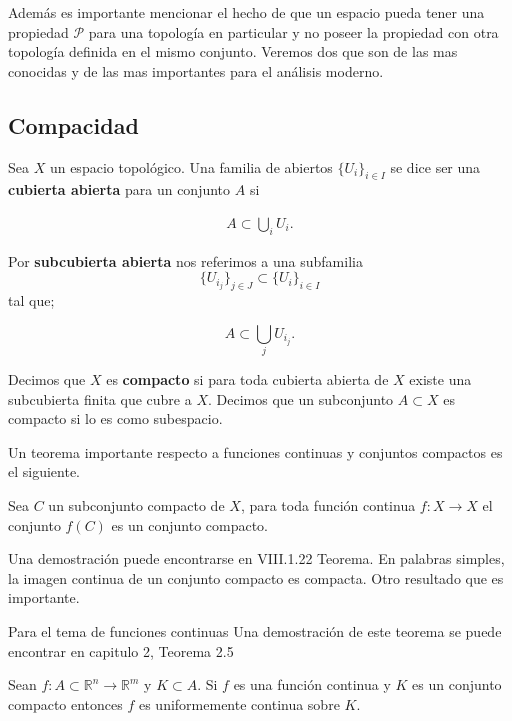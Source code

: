 Además es importante mencionar el hecho de que un espacio pueda tener una propiedad $\mathcal{P}$ para una topología en particular y no poseer la propiedad con otra topología definida en el mismo conjunto. Veremos dos que son de las mas conocidas y de las mas importantes para el análisis moderno. 

\subsection*{Compacidad}
\begin{df}
Sea $X$ un espacio topológico. Una familia de abiertos $\{U_i\}_{i \in I}$ se dice ser una \textbf{cubierta abierta} para un conjunto $A$ si 
	
\begin{align*}
A \subset \bigcup_i U_i.
\end{align*}

Por \textbf{subcubierta abierta} nos referimos a una subfamilia $$\{U_{i_j}\}_{j \in J} \subset \{U_i\}_{i \in I}$$ tal que;

$$ A \subset \bigcup_j U_{i_j}.$$

Decimos que $X$ es \textbf{compacto} si para toda cubierta abierta de $X$ existe una subcubierta finita que cubre a $X$. Decimos que un subconjunto $A \subset X$ es compacto si lo es como subespacio.


\end{df}

Un teorema importante respecto a funciones continuas y conjuntos compactos es el siguiente.
 
\begin{te}
Sea $C$ un subconjunto compacto de $X$, para toda función continua $f:X \to X$ el conjunto $f(C)$ es un conjunto compacto.
\end{te}

Una demostración puede encontrarse en \cite{top_prieto} VIII.1.22 Teorema. En palabras simples, la imagen continua de un conjunto compacto es compacta. Otro resultado que es importante.

Para el tema de funciones continuas Una demostración de este teorema se puede encontrar en capitulo 2, Teorema 2.5

\begin{te}
 Sean $f:A \subset \mathbb{R}^n \to \mathbb{R}^m$ y $K \subset A $. Si $f$ es una función continua y $K$ es un conjunto compacto entonces $f$ es uniformemente continua sobre $K$.

\end{te}
